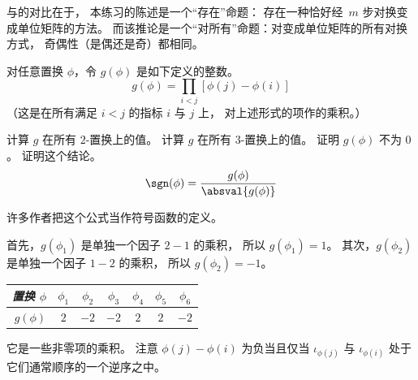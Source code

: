 \begin{exercises}
\begin{answer}
      与的对比在于，
      本练习的陈述是一个“存在”命题：
      存在一种恰好经~$m$ 步对换变成单位矩阵的方法。
      而该推论是一个“对所有”命题：对变成单位矩阵的所有对换方式，
      奇偶性（是偶还是奇）都相同。 
    \end{answer}
  \recommended \item 
    对任意置换 $\phi$，令 $g(\phi)$ 是如下定义的整数。
    \begin{equation*}
       g(\phi)=\prod_{i<j} [\phi(j)-\phi(i)]
    \end{equation*}
    （这是在所有满足 \( i<j \) 的指标 \( i \) 与 \( j \) 上，
    对上述形式的项作的乘积。）
    \begin{exparts}
      \partsitem 计算 $g$ 在所有 $2$-置换上的值。
      \partsitem 计算 $g$ 在所有 $3$-置换上的值。
      \partsitem 证明 $g(\phi)$ 不为 $0$。
      \partsitem 证明这个结论。
         \begin{equation*}
            \sgn(\phi)=\frac{g(\phi)}{\absval{g(\phi)}}
         \end{equation*}
    \end{exparts}
    许多作者把这个公式当作符号函数的定义。
    \begin{answer}
      \begin{exparts}
        \partsitem 首先，$g(\phi_1)$ 是单独一个因子 $2-1$ 的乘积，
          所以 $g(\phi_1)=1$。
          其次，$g(\phi_2)$ 是单独一个因子 $1-2$ 的乘积，
          所以 $g(\phi_2)=-1$。
        \partsitem 
            \begin{tabular}[t]{r|cccccc}
               \textit{置换 $\phi$} 
                 &$\phi_{1}$ &$\phi_{2}$ &$\phi_{3}$ 
                    &$\phi_{4}$ &$\phi_{5}$ &$\phi_{6}$ \\
               \hline
               $g(\phi)$ &$2$ &$-2$ &$-2$ &$2$ &$2$ &$-2$ 
            \end{tabular}
        \partsitem 它是一些非零项的乘积。
        \partsitem 注意 \( \phi(j)-\phi(i) \) 为负当且仅当
           \( \iota_{\phi(j)} \) 与 \( \iota_{\phi(i)} \) 处于它们通常顺序的一个逆序之中。
      \end{exparts}  
     \end{answer}

\end{exercises}
